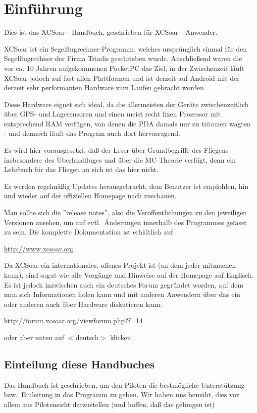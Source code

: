 \chapter{Einführung}\label{cha:introduction}
Dies ist das \textsf{XCSoar} - Handbuch, geschrieben für \textsf{XCSoar} - Anwender. 


\textsf{XCSoar} ist ein Segelflugrechner-Programm, welches ursprünglich einmal für den Segelflugrechner \al der Firma Triadis geschrieben wurde.  
Anschließend waren die vor ca. 10 Jahren aufgekommenen PocketPC das Ziel, in der Zwischenzeit läuft \textsf{XCSoar} jedoch auf fast allen Plattformen und ist derzeit auf Android mit der derzeit 
sehr performanten Hardware zum Laufen gebracht worden. 

Diese Hardware eignet sich ideal, da die allermeisten der Geräte zwischenzeitlich über GPS- und Lagesensoren und einen 
meist recht fixen Prozessor mit entsprechend RAM verfügen, von denen die PDA damals nur zu träumen wagten - und dennoch 
läuft das Program auch dort hervorragend. 


Es wird hier vorausgesetzt, daß der Leser über Grundbegriffe des Fliegens insbesondere des Überlandfluges 
und über die MC-Theorie verfügt, denn ein Lehrbuch für das Fliegen an sich ist das hier nicht.


Es werden regelmäßig Updates herausgebracht, dem Benutzer ist empfohlen, hin und wieder auf der offiziellen Homepage nach zuschauen. 

Man sollte sich die ''release notes'', also die Veröffentlichungen zu den jeweiligen Versionen ansehen, um  auf evtl.\ Änderungen innerhalb des Programmes gefasst zu sein. 
Die komplette Dokumentation ist erhältlich auf  
\begin{center}
\url{http://www.xcsoar.org}
\end{center}
Da \textsf{XCSoar} ein internationales, offenes Projekt ist (an dem jeder mitmachen kann), sind sogut wie alle Vorgänge und Hinweise auf der Homepage auf Englisch. 
Es ist jedoch inzwischen auch ein deutsches Forum gegründet worden, auf dem man sich Informationen holen kann und mit anderen Anwendern über das ein oder anderen auch über Hardware diskutieren kann.
\begin{center}
\url{http://forum.xcsoar.org/viewforum.php?f=14}
\end{center}
oder aber unten auf $<$deutsch$>$ klicken

\section{Einteilung diese Handbuches}
Das Handbuch ist geschrieben, um den Piloten die bestmögliche Unterstützung bzw.\ Einleitung in das Programm zu geben. 
Wir haben uns bemüht, dies vor allem aus Pilotensicht darzustellen (und hoffen, daß das gelungen ist) 

